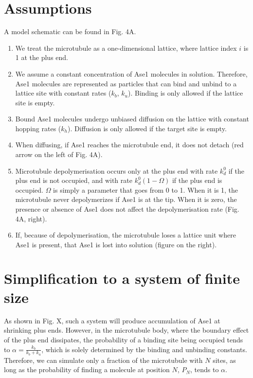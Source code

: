 \documentclass{article}
\begin{document}
\section{Assumptions}
A model schematic can be found in Fig. 4A.

\begin{enumerate}
	\item We treat the microtubule as a one-dimensional lattice, where lattice index $i$ is 1 at the plus end.
	\item We assume a constant concentration of Ase1 molecules in solution. Therefore, Ase1 molecules are represented as particles that can bind and unbind to a lattice site with constant rates ($k_b$, $k_u$). Binding is only allowed if the lattice site is empty.
	\item Bound Ase1 molecules undergo unbiased diffusion on the lattice with constant hopping rates ($k_h$). Diffusion is only allowed if the target site is empty.
	\item When diffusing, if Ase1 reaches the microtubule end, it does not detach (red arrow on the left of Fig. 4A).
	\item Microtubule depolymerisation occurs only at the plus end with rate $k_d^0$ if the plus end is not occupied, and with rate $k_d^0(1-\Omega)$ if the plus end is occupied. $\Omega$ is simply a parameter that goes from 0 to 1. When it is 1, the microtubule never depolymerizes if Ase1 is at the tip. When it is zero, the presence or absence of Ase1 does not affect the depolymerisation rate (Fig. 4A, right).
	\item If, because of depolymerisation, the microtubule loses a lattice unit where Ase1 is present, that Ase1 is lost into solution (figure on the right).
\end{enumerate}

\section{Simplification to a system of finite size}

As shown in Fig. X, such a system will produce accumulation of Ase1 at shrinking plus ends. However, in the microtubule body, where the boundary effect of the plus end dissipates, the probability of a binding site being occupied tends to $\alpha=\frac{k_b}{k_b+k_u}$, which is solely determined by the binding and unbinding constants.
Therefore, we can simulate only a fraction of the microtubule with $N$ sites, as long as the probability of finding a molecule at position $N$, $P_N$, tends to $\alpha$.
\end{document}
